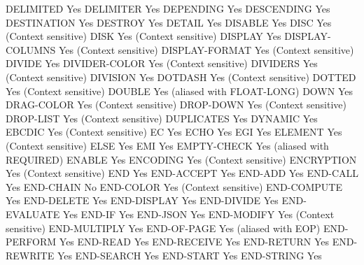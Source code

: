 DELIMITED                       Yes
DELIMITER                       Yes
DEPENDING                       Yes
DESCENDING                      Yes
DESTINATION                     Yes
DESTROY                         Yes
DETAIL                          Yes
DISABLE                         Yes
DISC                            Yes (Context sensitive)
DISK                            Yes (Context sensitive)
DISPLAY                         Yes
DISPLAY-COLUMNS                 Yes (Context sensitive)
DISPLAY-FORMAT                  Yes (Context sensitive)
DIVIDE                          Yes
DIVIDER-COLOR                   Yes (Context sensitive)
DIVIDERS                        Yes (Context sensitive)
DIVISION                        Yes
DOTDASH                         Yes (Context sensitive)
DOTTED                          Yes (Context sensitive)
DOUBLE                          Yes (aliased with FLOAT-LONG)
DOWN                            Yes
DRAG-COLOR                      Yes (Context sensitive)
DROP-DOWN                       Yes (Context sensitive)
DROP-LIST                       Yes (Context sensitive)
DUPLICATES                      Yes
DYNAMIC                         Yes
EBCDIC                          Yes (Context sensitive)
EC                              Yes
ECHO                            Yes
EGI                             Yes
ELEMENT                         Yes (Context sensitive)
ELSE                            Yes
EMI                             Yes
EMPTY-CHECK                     Yes (aliased with REQUIRED)
ENABLE                          Yes
ENCODING                        Yes (Context sensitive)
ENCRYPTION                      Yes (Context sensitive)
END                             Yes
END-ACCEPT                      Yes
END-ADD                         Yes
END-CALL                        Yes
END-CHAIN                       No
END-COLOR                       Yes (Context sensitive)
END-COMPUTE                     Yes
END-DELETE                      Yes
END-DISPLAY                     Yes
END-DIVIDE                      Yes
END-EVALUATE                    Yes
END-IF                          Yes
END-JSON                        Yes
END-MODIFY                      Yes (Context sensitive)
END-MULTIPLY                    Yes
END-OF-PAGE                     Yes (aliased with EOP)
END-PERFORM                     Yes
END-READ                        Yes
END-RECEIVE                     Yes
END-RETURN                      Yes
END-REWRITE                     Yes
END-SEARCH                      Yes
END-START                       Yes
END-STRING                      Yes
